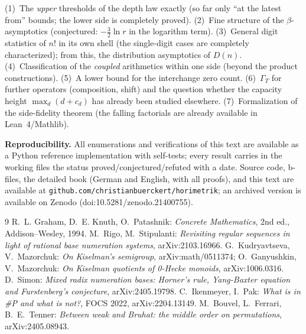 \documentclass[11pt]{article}
\theoremstyle{definition}
\theoremstyle{remark}
\begin{document}
(1)~The \emph{upper} thresholds of the depth law exactly (so far
only ``at the latest from'' bounds; the lower side is completely
proved). (2)~Fine structure of the $\beta$-asymptotics (conjectured:
$-\tfrac32\ln r$ in the logarithm term). (3)~General digit
statistics of $n!$ in its own shell (the single-digit cases are
completely characterized); from this, the distribution asymptotics
of $D(n)$. (4)~Classification of the \emph{coupled} arithmetics
within one side (beyond the product constructions).
(5)~A lower bound for the interchange zero count.
(6)~$\Gamma_T$ for further operators (composition, shift) and the
question whether the capacity height $\max_d(d+c_d)$ has already
been studied elsewhere. (7)~Formalization of the side-fidelity
theorem (the falling factorials are already available in
Lean~4/Mathlib).

\bigskip
\noindent\textbf{Reproducibility.} All enumerations and
verifications of this text are available as a Python reference
implementation with self-tests; every result carries in the working
files the status proved/conjectured/refuted with a date. Source
code, b-files, the detailed book (German and English, with all
proofs), and this text are available at
\texttt{github.com/christianbuerckert/horimetrik}; an archived
version is available on Zenodo (doi:10.5281/zenodo.21400755).

\begin{thebibliography}{9}
 R.~L. Graham, D.~E. Knuth, O.~Patashnik:
\emph{Concrete Mathematics}, 2nd ed., Addison--Wesley, 1994.
 M.~Rigo, M.~Stipulanti: \emph{Revisiting regular
sequences in light of rational base numeration systems},
arXiv:2103.16966.
 G.~Kudryavtseva, V.~Mazorchuk: \emph{On
Kiselman's semigroup}, arXiv:math/0511374; O.~Ganyushkin,
V.~Mazorchuk: \emph{On Kiselman quotients of 0-Hecke monoids},
arXiv:1006.0316.
 D.~Simon: \emph{Mixed radix numeration bases:
Horner's rule, Yang-Baxter equation and Furstenberg's conjecture},
arXiv:2405.19798.
 C.~Ikenmeyer, I.~Pak: \emph{What is in \#P
and what is not?}, FOCS 2022, arXiv:2204.13149.
 M.~Bouvel, L.~Ferrari, B.~E.~Tenner:
\emph{Between weak and Bruhat: the middle order on permutations},
arXiv:2405.08943.
\end{thebibliography}
\end{document}
